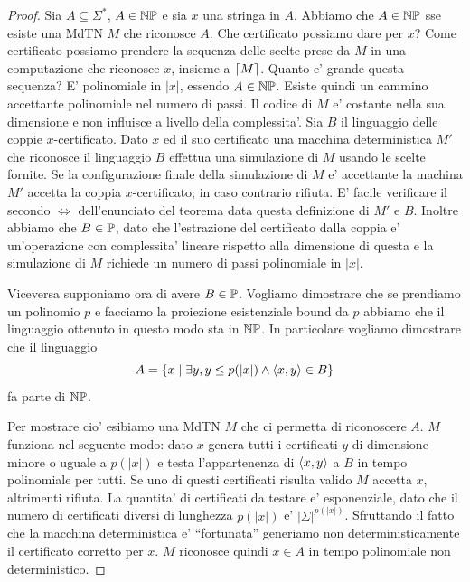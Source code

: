 \begin{proof}

    Sia $A \subseteq \Sigma^{*}$, $A \in \mathbb{NP}$ e sia $x$ una stringa in $A$. Abbiamo che $A \in
    \mathbb{NP}$ sse esiste una MdTN $M$ che riconosce $A$. Che certificato possiamo dare per $x$?
    Come certificato possiamo prendere la sequenza delle scelte prese da $M$ in una computazione che
    riconosce $x$, insieme a $\lceil M \rceil$. Quanto e' grande questa sequenza? E' polinomiale in $|x|$,
    essendo $A \in \mathbb{NP}$. Esiste quindi un cammino accettante polinomiale nel numero di passi.
    Il codice di $M$ e' costante nella sua dimensione e non influisce a livello della complessita'.
    Sia $B$ il linguaggio delle coppie $x$-certificato. Dato $x$ ed il suo certificato una macchina
    deterministica $M'$ che riconosce il linguaggio $B$ effettua una simulazione di $M$ usando le scelte
    fornite. Se la configurazione finale della simulazione di $M$ e' accettante la machina $M'$
    accetta la coppia $x$-certificato; in caso contrario rifiuta. E' facile verificare il secondo $\iff$
    dell'enunciato del teorema data questa definizione di $M'$ e $B$. Inoltre abbiamo che $B \in
    \mathbb{P}$, dato che l'estrazione del certificato dalla coppia e' un'operazione con complessita'
    lineare rispetto alla dimensione di questa e la simulazione di $M$ richiede un numero di passi
    polinomiale in $|x|$.

    Viceversa supponiamo ora di avere $B \in \mathbb{P}$. Vogliamo dimostrare che se prendiamo un
    polinomio $p$ e facciamo la proiezione esistenziale bound da $p$ abbiamo che il linguaggio
    ottenuto in questo modo sta in $\mathbb{NP}$. In particolare vogliamo dimostrare che il linguaggio
    \begin{equation*}
        A = \left\{x \mid \exists y, y \leq p(|x|) \land \langle x, y \rangle \in B\right\}
    \end{equation*}
    fa parte di $\mathbb{NP}$.

    Per mostrare cio' esibiamo una MdTN $M$ che ci permetta di riconoscere $A$. $M$ funziona nel
    seguente modo: dato $x$ genera tutti i certificati $y$ di dimensione minore o uguale a $p(|x|)$
    e testa l'appartenenza di $\langle x, y \rangle$ a $B$ in tempo polinomiale per tutti. Se uno di questi
    certificati risulta valido $M$ accetta $x$, altrimenti rifiuta. La quantita' di certificati da
    testare e' esponenziale, dato che il numero di certificati diversi di lunghezza $p(|x|)$ e'
    $|\Sigma|^{p(|x|)}$. Sfruttando il fatto che la macchina deterministica e' ``fortunata''
    generiamo non deterministicamente il certificato corretto per $x$. $M$ riconosce quindi $x
    \in A$ in tempo polinomiale non deterministico.

\end{proof}

